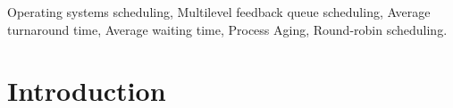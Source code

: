 \documentclass[conference]{IEEEtran}
\begin{document}

\begin{IEEEkeywords}
Operating systems scheduling, Multilevel feedback queue scheduling, Average turnaround time, Average waiting time, Process Aging, Round-robin scheduling.
\end{IEEEkeywords}


\section{Introduction}
\end{document}
